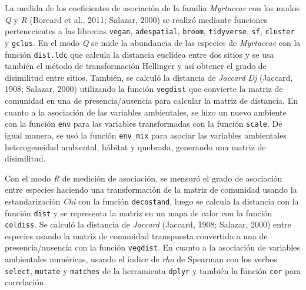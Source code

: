 \documentclass[11pt,]{article}
\begin{document}
La medida de los coeficientes de asociación de la familia
\emph{Myrtaceae} con los modos \emph{Q} y \emph{R} (Borcard et al.,
2011; Salazar, 2000) se realizó mediante funciones pertenecientes a las
librerias \texttt{vegan}, \texttt{adespatial}, \texttt{broom},
\texttt{tidyverse}, \texttt{sf}, \texttt{cluster} y \texttt{gclus}. En
el modo \emph{Q} se mide la abundancia de las especies de
\emph{Myrtaceae} con la función \texttt{dist.ldc} que calcula la
distancia euclídea entre dos sitios y se usa también el método de
transformación Hellinger y así obtener el grado de disimilitud entre
sitios. También, se calculó la distancia de \emph{Jaccard} \emph{Dj}
(Jaccard, 1908; Salazar, 2000) utilizando la función \texttt{vegdist}
que convierte la matriz de comunidad en una de presencia/ausencia para
calcular la matriz de distancia. En cuanto a la asociación de las
variables ambientales, se hizo un nuevo ambiente con la función
\texttt{env} para las variables transformadas con la función
\texttt{scale}. De igual manera, se usó la función \texttt{env\_mix}
para asociar las variables ambientales heterogeneidad ambiental, hábitat
y quebrada, generando una matriz de disimilitud.

Con el modo \emph{R} de medición de asociación, se mensuró el grado de
asociación entre especies haciendo una transformación de la matriz de
comunidad usando la estandarización \emph{Chi} con la función
\texttt{decostand}, luego se calcula la distancia con la función
\texttt{dist} y se representa la matriz en un mapa de calor con la
función \texttt{coldiss}. Se calculó la distancia de \emph{Jaccard}
(Jaccard, 1908; Salazar, 2000) entre especies usando la matriz de
comunidad transpuesta convertida a una de presencia/ausencia con la
función \texttt{vegdist}. En cuanto a la asociación de variables
ambientales numéricas, usando el índice de \emph{rho} de Spearman con
los verbos \texttt{select}, \texttt{mutate} y \texttt{matches} de la
herramienta \texttt{dplyr} y también la función \texttt{cor} para
correlación.
\end{document}
